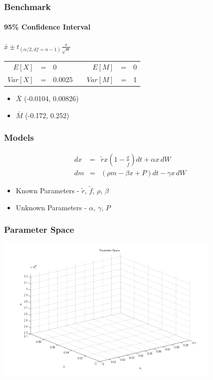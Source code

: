 \begin{frame}
    \frametitle{Benchmark}
	\framesubtitle{95\% Confidence Interval}
\begin{center}
	$\bar{x} \pm t_{(\alpha /2, df=n-1)} \frac{s}{\sqrt{n}}$ \\ 
\vspace{5mm}
\begin{tabular}{r c l c r c l}
	$E[X]$ &=& 0 && $E[M]$ &=& 0 \\
	$Var[X]$ &=& 0.0025  && $Var[M]$ &=& 1 
\end{tabular}
\end{center}
\begin{itemize}
	\item $\bar{X}$ (-0.0104, 0.00826)
	\item $\bar{M}$ (-0.172, 0.252)
\end{itemize}
\end{frame}


\begin{frame}
    \frametitle{Models}
	\begin{eqnarray}
		dx &=& \tilde{r} x \left( 1- \frac{x}{\tilde{f}}\right) dt +\alpha x \, dW \\
		dm &=& ( \rho m - \beta x + P) dt - \gamma x \, dW
	\end{eqnarray}
	\begin{itemize}
		\item Known Parameters - $\tilde{r}$, $\tilde{f}$, $\rho$, $\beta$
		\item Unknown Parameters - $\alpha$, $\gamma$, $P$
	\end{itemize}
\end{frame}


\begin{frame}
    \frametitle{Parameter Space}
\hspace*{-1cm}
\includegraphics[height=7cm]{parameterspace}
\end{frame}

